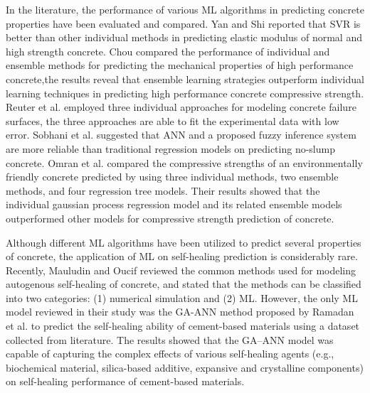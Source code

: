 \documentclass[11pt]{article}
\begin{document}
	In the literature, the performance of various ML algorithms in predicting concrete properties have been evaluated and compared. Yan and Shi \cite{yan2010prediction} reported that SVR is better than other individual methods in predicting elastic modulus of normal and high strength concrete. Chou \cite{chou2014machine} compared the performance of individual and ensemble methods for predicting the mechanical properties of high performance concrete,the results reveal that ensemble learning strategies outperform individual learning techniques in predicting high performance concrete compressive strength. Reuter et al. \cite{reuter2018comparative} employed three individual approaches for modeling concrete failure surfaces, the three approaches are able to fit the experimental data with low error. Sobhani et al. \cite{sobhani2010prediction} suggested that ANN and a proposed fuzzy inference system are more reliable than traditional regression models on predicting no-slump concrete. Omran et al. \cite{omran2016comparison} compared the compressive strengths of an environmentally friendly concrete predicted by using three individual methods, two ensemble methods, and four regression tree models. Their results showed that the individual gaussian process regression model and its related ensemble models outperformed other models for compressive strength prediction of concrete.
	

    Although different ML algorithms have been utilized to predict several properties of concrete, the application of ML on self-healing prediction is considerably rare. Recently, Mauludin and Oucif \cite{mauludin2019modeling} reviewed the common methods used for modeling autogenous self-healing of concrete, and stated that the methods can be classified into two categories: (1) numerical simulation and (2) ML. However, the only ML model reviewed in their study was the GA-ANN method proposed by Ramadan et al. \cite{ramadan2017modeling} to predict the self-healing ability of cement-based materials using a dataset collected from literature. The results showed that the  GA–ANN model was capable of capturing the complex effects of various self-healing agents (e.g., biochemical material, silica-based additive, expansive and crystalline components) on self-healing performance of cement-based materials. 
	
	
\end{document}
